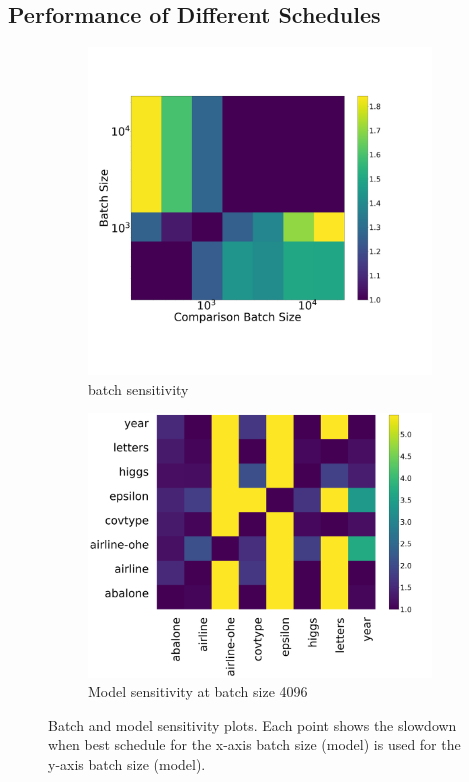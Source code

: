 \subsection{Performance of Different Schedules} 

\begin{figure}[htb]
  \begin{subfigure}[t]{.45\linewidth}
    \centering
    \includegraphics[width=\linewidth]{figures/batch_sensitivity_covtype.png}
    \caption{\label{fig:sensitivitya} batch sensitivity}
  \end{subfigure}
  \begin{subfigure}[t]{.45\linewidth}
    \centering
    \includegraphics[width=\linewidth]{figures/model_sensitivity_4096.png}
    \caption{\label{fig:sensitivityb}Model sensitivity at batch size 4096}
\end{subfigure}
  \caption{Batch and model sensitivity plots. Each point shows the slowdown when best schedule for the
          x-axis batch size (model) is used for the y-axis batch size (model).}
\end{figure}

